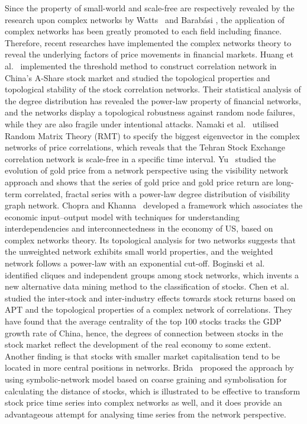 Since the property of small-world and scale-free are respectively revealed by the research upon complex networks by Watts~\cite{watts1998collective} and Barab{\'a}si \cite{barabasi1999emergence}, the application of complex networks has been greatly promoted to each field including finance. Therefore, recent researches have implemented the complex networks theory to reveal the underlying factors of price movements in financial markets. Huang et al.~\cite{chinesenetwork} implemented the threshold method to construct correlation network in China's A-Share stock market and studied the topological properties and topological stability of the stock correlation networks. Their statistical analysis of the degree distribution has revealed the power-law property of financial networks, and the networks display a topological robustness against random node failures, while they are also fragile under intentional attacks. Namaki et al.~\cite{genuine} utilised Random Matrix Theory (RMT) to specify the biggest eigenvector in the complex networks of price correlations, which reveals that the Tehran Stock Exchange correlation network is scale-free in a specific time interval. Yu~\cite{visibility} studied the evolution of gold price from a network perspective using the visibility network approach and shows that the series of gold price and gold price return are long-term correlated, fractal series with a power-law degree distribution of visibility graph network. Chopra and Khanna~\cite{intercd} developed a framework which associates the economic input–output model with techniques for understanding interdependencies and interconnectedness in the economy of US, based on complex networks theory. Its topological analysis for two networks suggests that the unweighted network exhibits small world properties, and the weighted network follows a power-law with an exponential cut-off. Boginski et al.~\cite{statisticalanalysis} identified cliques and independent groups among stock networks, which  invents a new alternative data mining method to the classification of stocks. Chen et al.~\cite{CHEN2015224} studied the inter-stock and inter-industry effects towards stock returns based on APT and the topological properties of a complex network of correlations. They have found that the average centrality of the top 100 stocks tracks the GDP growth rate of China, hence, the degrees of connection between stocks in the stock market reflect the development of the real economy to some extent. Another finding is that stocks with smaller market capitalisation tend to be located in more central positions in networks. Brida~\cite{brida2002high} proposed the approach by using symbolic-network model based on coarse graining and symbolisation for calculating the distance of stocks, which is illustrated to be effective to transform stock price time series into complex networks as well, and it does provide an advantageous attempt for analysing time series from the network perspective.


